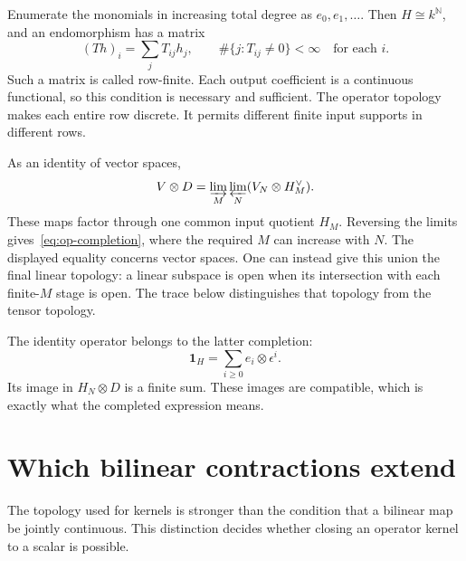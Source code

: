 Enumerate the monomials in increasing total degree as $e_0,e_1,\ldots$.
Then $H\cong k^{\mathbb N}$, and an endomorphism has a matrix
\begin{equation}
 (Th)_i=\sum_jT_{ij}h_j,
 \qquad \#\{j:T_{ij}\ne0\}<\infty\quad\text{for each }i.
 \label{eq:op-rows}
\end{equation}
Such a matrix is called row-finite. Each output coefficient is a
continuous functional, so this condition is necessary and sufficient.
The operator topology makes each entire row discrete. It permits
different finite input supports in different rows.

As an identity of vector spaces,
\[
 V\otimes D
   =\varinjlim_M\varprojlim_N(V_N\otimes H_M^\vee).
\]
These maps factor through one common input quotient $H_M$.
Reversing the limits gives~\eqref{eq:op-completion}, where the required
$M$ can increase with $N$. The displayed equality concerns vector spaces.
One can instead give this union the final linear topology: a linear
subspace is open when its intersection with each finite-$M$ stage is open.
The trace below distinguishes that topology from the tensor topology.

The identity operator belongs to the latter completion:
\begin{equation}
 \mathbf1_H=\sum_{i\geq0}e_i\otimes\epsilon^i.
 \label{eq:op-identity}
\end{equation}
Its image in $H_N\otimes D$ is a finite sum. These images are
compatible, which is exactly what the completed expression means.

\section{Which bilinear contractions extend}

The topology used for kernels is stronger than the condition that a
bilinear map be jointly continuous. This distinction decides whether
closing an operator kernel to a scalar is possible.

